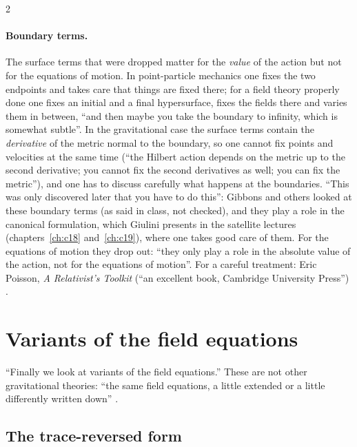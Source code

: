 \begin{paracol}{2}
\paragraph{Boundary terms.} The surface terms that were dropped matter for the \emph{value} of the action but not for the equations of motion. In point-particle mechanics one fixes the two endpoints and takes care that things are fixed there; for a field theory properly done one fixes an initial and a final hypersurface, fixes the fields there and varies them in between, ``and then maybe you take the boundary to infinity, which is somewhat subtle''. In the gravitational case the surface terms contain the \emph{derivative} of the metric normal to the boundary, so one cannot fix points and velocities at the same time (``the Hilbert action depends on the metric up to the second derivative; you cannot fix the second derivatives as well; you can fix the metric''), and one has to discuss carefully what happens at the boundaries. ``This was only discovered later that you have to do this'': Gibbons and others looked at these boundary terms (as said in class, not checked), and they play a role in the canonical formulation, which Giulini presents in the satellite lectures (chapters~\ref{ch:c18} and~\ref{ch:c19}), where one takes good care of them. For the equations of motion they drop out: ``they only play a role in the absolute value of the action, not for the equations of motion''. For a careful treatment: Eric Poisson, \emph{A Relativist's Toolkit} (``an excellent book, Cambridge University Press'') .

\section{Variants of the field equations}\label{sec:c15-variants}

``Finally we look at variants of the field equations.'' These are not other gravitational theories: ``the same field equations, a little extended or a little differently written down'' .

\subsection{The trace-reversed form}


\end{paracol}
